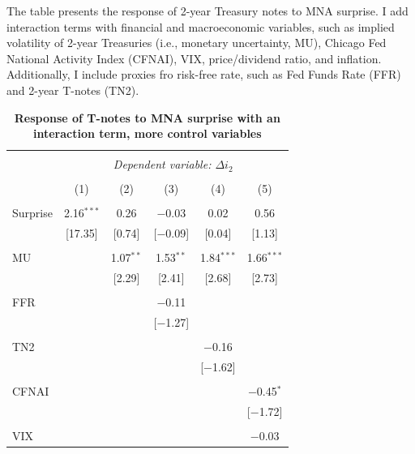 \documentclass[12pt]{article}
\begin{document}
\begin{table}[!htbp] \centering 
  \caption{\textbf{Response of T-notes to MNA surprise with an interaction term, more control variables}} 
  \label{} 
    \begin{flushleft}
    {\medskip\small
 The table presents the response of 2-year Treasury notes to MNA surprise. I add interaction terms with financial and macroeconomic variables, such as implied volatility of 2-year Treasuries (i.e., monetary uncertainty, MU), Chicago Fed National Activity Index (CFNAI), VIX, price/dividend ratio, and inflation. Additionally, I include proxies fro risk-free rate, such as Fed Funds Rate (FFR) and 2-year T-notes (TN2).}
    \medskip
    \end{flushleft}
  \footnotesize
{\renewcommand{\arraystretch}{0.76}
\begin{tabular}{@{\extracolsep{5pt}}lccccc} 
\\[-1.8ex]\hline 
\hline \\[-1.8ex] 
 & \multicolumn{5}{c}{\textit{Dependent variable: $\Delta i_2$}} \\ 
\cline{2-6} 
\\[-1.8ex] & (1) & (2) & (3) & (4) & (5)\\ 
\hline \\[-1.8ex] 
 Surprise & 2.16$^{***}$ & 0.26 & $-$0.03 & 0.02 & 0.56 \\ 
  & [17.35] & [0.74] & [$-$0.09] & [0.04] & [1.13] \\ 
  & & & & & \\ 
 MU &  & 1.07$^{**}$ & 1.53$^{**}$ & 1.84$^{***}$ & 1.66$^{***}$ \\ 
  &  & [2.29] & [2.41] & [2.68] & [2.73] \\ 
  & & & & & \\ 
 FFR &  &  & $-$0.11 &  &  \\ 
  &  &  & [$-$1.27] &  &  \\ 
  & & & & & \\ 
 TN2 &  &  &  & $-$0.16 &  \\ 
  &  &  &  & [$-$1.62] &  \\ 
  & & & & & \\ 
 CFNAI &  &  &  &  & $-$0.45$^{*}$ \\ 
  &  &  &  &  & [$-$1.72] \\ 
  & & & & & \\ 
 VIX &  &  &  &  & $-$0.03 \\ 

\end{tabular}}
\end{table}
\end{document}
